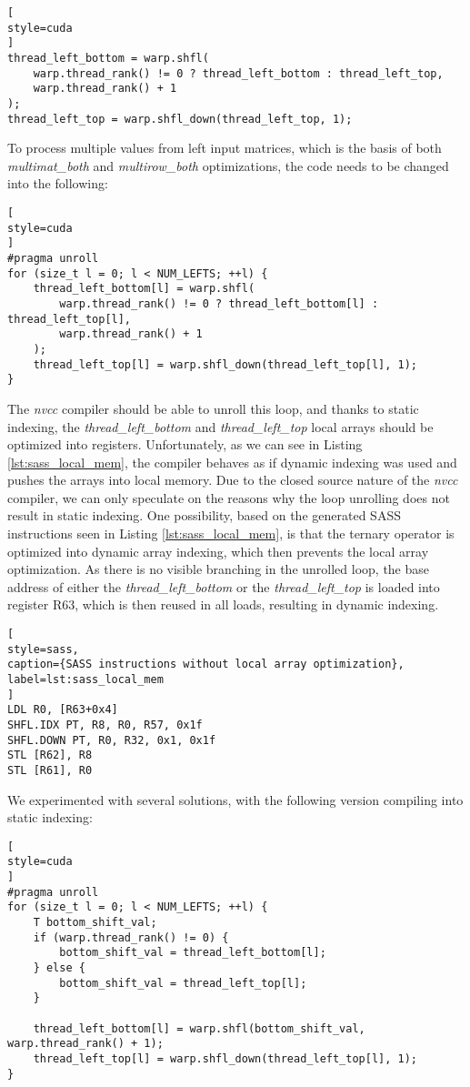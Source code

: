 \begin{lstlisting}[
style=cuda
]
thread_left_bottom = warp.shfl(
	warp.thread_rank() != 0 ? thread_left_bottom : thread_left_top,
	warp.thread_rank() + 1
);
thread_left_top = warp.shfl_down(thread_left_top, 1);
\end{lstlisting}

To process multiple values from left input matrices, which is the basis of both \textit{multimat\_both} and \textit{multirow\_both} optimizations, the code needs to be changed into the following:

\begin{lstlisting}[
style=cuda
]
#pragma unroll
for (size_t l = 0; l < NUM_LEFTS; ++l) {
	thread_left_bottom[l] = warp.shfl(
		warp.thread_rank() != 0 ? thread_left_bottom[l] : thread_left_top[l],
		warp.thread_rank() + 1
	);
	thread_left_top[l] = warp.shfl_down(thread_left_top[l], 1);
}
\end{lstlisting}

The \textit{nvcc} compiler should be able to unroll this loop, and thanks to static indexing, the \textit{thread\_left\_bottom} and \textit{thread\_left\_top} local arrays should be optimized into registers. Unfortunately, as we can see in Listing \ref{lst:sass_local_mem}, the compiler behaves as if dynamic indexing was used and pushes the arrays into local memory. 
Due to the closed source nature of the \textit{nvcc} compiler, we can only speculate on the reasons why the loop unrolling does not result in static indexing. One possibility, based on the generated SASS instructions seen in Listing \ref{lst:sass_local_mem}, is that the ternary operator is optimized into dynamic array indexing, which then prevents the local array optimization. As there is no visible branching in the unrolled loop, the base address of either the \textit{thread\_left\_bottom} or the \textit{thread\_left\_top} is loaded into register R63, which is then reused in all loads, resulting in dynamic indexing. 

\begin{lstlisting}[
style=sass,
caption={SASS instructions without local array optimization},
label=lst:sass_local_mem
]
LDL R0, [R63+0x4]
SHFL.IDX PT, R8, R0, R57, 0x1f
SHFL.DOWN PT, R0, R32, 0x1, 0x1f
STL [R62], R8
STL [R61], R0
\end{lstlisting}

We experimented with several solutions, with the following version compiling into static indexing:

\begin{lstlisting}[
style=cuda
]
#pragma unroll
for (size_t l = 0; l < NUM_LEFTS; ++l) {
	T bottom_shift_val;
	if (warp.thread_rank() != 0) {
		bottom_shift_val = thread_left_bottom[l];
	} else {
		bottom_shift_val = thread_left_top[l];
	}

	thread_left_bottom[l] = warp.shfl(bottom_shift_val, warp.thread_rank() + 1);
	thread_left_top[l] = warp.shfl_down(thread_left_top[l], 1);
}
\end{lstlisting}


